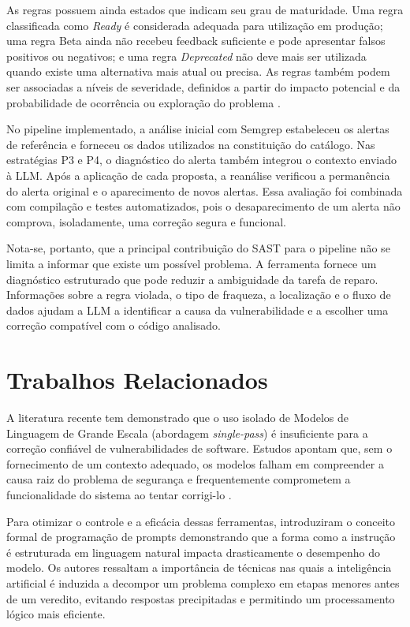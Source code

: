 As regras possuem ainda estados que indicam seu grau de maturidade. Uma regra classificada como \textit{Ready} é considerada adequada para utilização em produção; uma regra Beta ainda não recebeu feedback suficiente e pode apresentar falsos positivos ou negativos; e uma regra \textit{Deprecated} não deve mais ser utilizada quando existe uma alternativa mais atual ou precisa. As regras também podem ser associadas a níveis de severidade, definidos a partir do impacto potencial e da probabilidade de ocorrência ou exploração do problema \cite{noauthor_sonarqube_2026}.

No pipeline implementado, a análise inicial com Semgrep estabeleceu os alertas de referência e forneceu os dados utilizados na constituição do catálogo. Nas estratégias P3 e P4, o diagnóstico do alerta também integrou o contexto enviado à LLM. Após a aplicação de cada proposta, a reanálise verificou a permanência do alerta original e o aparecimento de novos alertas. Essa avaliação foi combinada com compilação e testes automatizados, pois o desaparecimento de um alerta não comprova, isoladamente, uma correção segura e funcional.

Nota-se, portanto, que a principal contribuição do SAST para o pipeline não se limita a informar que existe um possível problema. A ferramenta fornece um diagnóstico estruturado que pode reduzir a ambiguidade da tarefa de reparo. Informações sobre a regra violada, o tipo de fraqueza, a localização e o fluxo de dados ajudam a LLM a identificar a causa da vulnerabilidade e a escolher uma correção compatível com o código analisado.


\section{Trabalhos Relacionados}

A literatura recente tem demonstrado que o uso isolado de Modelos de Linguagem de Grande Escala (abordagem \textit{single-pass}) é insuficiente para a correção confiável de vulnerabilidades de software. Estudos apontam que, sem o fornecimento de um contexto adequado, os modelos falham em compreender a causa raiz do problema de segurança e frequentemente comprometem a funcionalidade do sistema ao tentar corrigi-lo \cite{dai_rethinking_2025}.

Para otimizar o controle e a eficácia dessas ferramentas,  introduziram o conceito formal de programação de prompts demonstrando que a forma como a instrução é estruturada em linguagem natural impacta drasticamente o desempenho do modelo. Os autores ressaltam a importância de técnicas nas quais a inteligência artificial é induzida a decompor um problema complexo em etapas menores antes de um veredito, evitando respostas precipitadas e permitindo um processamento lógico mais eficiente.

